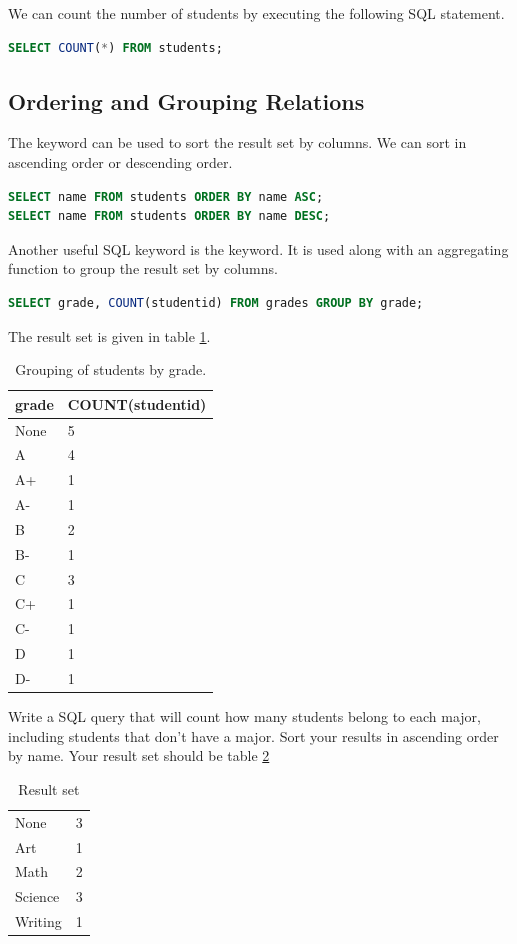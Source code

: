 We can count the number of students by executing the following SQL statement.
\begin{lstlisting}[language=SQL]
SELECT COUNT(*) FROM students;
\end{lstlisting}

\subsection*{Ordering and Grouping Relations}
The  keyword can be used to sort the result set by columns.
We can sort in ascending order or descending order.
\begin{lstlisting}[language=SQL]
SELECT name FROM students ORDER BY name ASC;
SELECT name FROM students ORDER BY name DESC;
\end{lstlisting}

Another useful SQL keyword is the  keyword.
It is used along with an aggregating function to group the result set by columns.
\begin{lstlisting}[language=SQL]
SELECT grade, COUNT(studentid) FROM grades GROUP BY grade;
\end{lstlisting}
The result set is given in table \ref{table:group_by_grade}.
\begin{table}
\begin{tabular}{|l|l|}
\hline
grade & COUNT(studentid) \\
\hline
None & 5 \\
A & 4 \\
A+ & 1 \\
A- & 1 \\
B & 2 \\
B- & 1 \\
C & 3 \\
C+ & 1 \\
C- & 1 \\
D & 1 \\
D- & 1 \\
\hline
\end{tabular}
\caption{Grouping of students by grade.}
\label{table:group_by_grade}
\end{table}

\begin{problem}
Write a SQL query that will count how many students belong to each major, including students that don't have a major.  Sort your results in ascending order by name.
Your result set should be table \ref{table:grouporder}
\begin{table}[H]
\begin{tabular}{|l|l|}
\hline
None & 3 \\
Art & 1 \\
Math & 2 \\
Science & 3 \\
Writing & 1 \\
\hline
\end{tabular}
\caption{Result set}
\label{table:grouporder}
\end{table}
\label{prob:studentmajors}
\end{problem}

